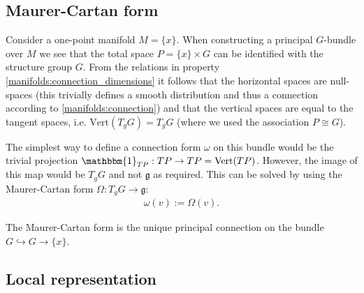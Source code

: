 \subsection{Maurer-Cartan form}


    \begin{construct}
        Consider a one-point manifold $M = \{x\}$. When constructing a principal $G$-bundle over $M$ we see that the total space $P = \{x\}\times G$ can be identified with the structure group $G$. From the relations in property \ref{manifolds:connection_dimensions} it follows that the horizontal spaces are null-spaces (this trivially defines a smooth distribution and thus a connection according to \ref{manifolds:connection}) and that the vertical spaces are equal to the tangent spaces, i.e. $\text{Vert}(T_gG) = T_gG$ (where we used the association $P\cong G$).

        The simplest way to define a connection form $\omega$ on this bundle would be the trivial projection $\mathbbm{1}_{TP}:TP\rightarrow TP=\text{Vert}(TP)$. However, the image of this map would be $T_gG$ and not $\mathfrak{g}$ as required. This can be solved by using the Maurer-Cartan form $\Omega:T_gG\rightarrow\mathfrak{g}$:
        \begin{gather}
            \omega(v) := \Omega(v).
        \end{gather}
    \end{construct}

    \begin{property}
        The Maurer-Cartan form is the unique principal connection on the bundle $G\hookrightarrow G\rightarrow \{x\}$.
    \end{property}

\subsection{Local representation}


